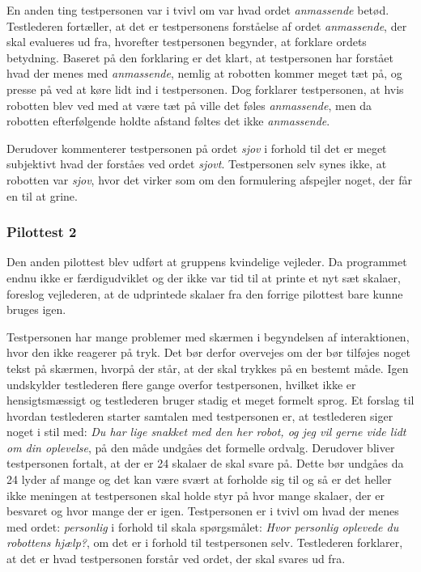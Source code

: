 En anden ting testpersonen var i tvivl om var hvad ordet \textit{anmassende} betød. Testlederen fortæller, at det er testpersonens forståelse af ordet \textit{anmassende}, der skal evalueres ud fra, hvorefter testpersonen begynder, at forklare ordets betydning. Baseret på den forklaring er det klart, at testpersonen har forstået hvad der menes med \textit{anmassende}, nemlig at robotten kommer meget tæt på, og presse på ved at køre lidt ind i testpersonen. Dog forklarer testpersonen, at hvis robotten blev ved med at være tæt på ville det føles \textit{anmassende}, men da robotten efterfølgende holdte afstand føltes det ikke \textit{anmassende}.

Derudover kommenterer testpersonen på ordet \textit{sjov} i forhold til det er meget subjektivt hvad der forståes ved ordet \textit{sjovt}. Testpersonen selv synes ikke, at robotten var \textit{sjov}, hvor det virker som om den formulering afspejler noget, der får en til at grine.

\subsubsection*{Pilottest 2}
\label{TestAfSkalaerPilot2}
%
Den anden pilottest blev udført at gruppens kvindelige vejleder. Da programmet endnu ikke er færdigudviklet og der ikke var tid til at printe et nyt sæt skalaer, foreslog vejlederen, at de udprintede skalaer fra den forrige pilottest bare kunne bruges igen. 

Testpersonen har mange problemer med skærmen i begyndelsen af interaktionen, hvor den ikke reagerer på tryk. Det bør derfor overvejes om der bør tilføjes noget tekst på skærmen, hvorpå der står, at der skal trykkes på en bestemt måde. Igen undskylder testlederen flere gange overfor testpersonen, hvilket ikke er hensigtsmæssigt og testlederen bruger stadig et meget formelt sprog. Et forslag til hvordan testlederen starter samtalen med testpersonen er, at testlederen siger noget i stil med: \textit{Du har lige snakket med den her robot, og jeg vil gerne vide lidt om din oplevelse}, på den måde undgåes det formelle ordvalg. Derudover bliver testpersonen fortalt, at der er 24 skalaer de skal svare på. Dette bør undgåes da 24 lyder af mange og det kan være svært at forholde sig til og så er det heller ikke meningen at testpersonen skal holde styr på hvor mange skalaer, der er besvaret og hvor mange der er igen.\blankline     
%
Testpersonen er i tvivl om hvad der menes med ordet: \textit{personlig} i forhold til skala spørgsmålet: \textit{Hvor personlig oplevede du robottens hjælp?}, om det er i forhold til testpersonen selv. Testlederen forklarer, at det er hvad testpersonen forstår ved ordet, der skal svares ud fra.

